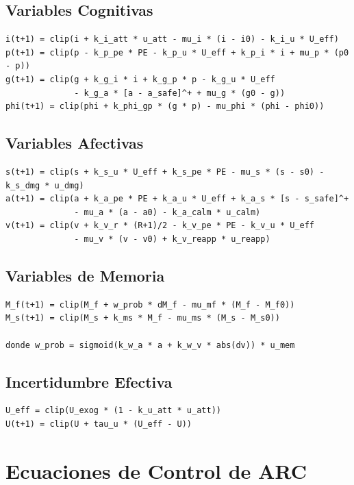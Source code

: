 \documentclass{article}
\begin{document}
\subsection{Variables Cognitivas}

\begin{verbatim}
i(t+1) = clip(i + k_i_att * u_att - mu_i * (i - i0) - k_i_u * U_eff)
p(t+1) = clip(p - k_p_pe * PE - k_p_u * U_eff + k_p_i * i + mu_p * (p0 - p))
g(t+1) = clip(g + k_g_i * i + k_g_p * p - k_g_u * U_eff
              - k_g_a * [a - a_safe]^+ + mu_g * (g0 - g))
phi(t+1) = clip(phi + k_phi_gp * (g * p) - mu_phi * (phi - phi0))
\end{verbatim}

\subsection{Variables Afectivas}

\begin{verbatim}
s(t+1) = clip(s + k_s_u * U_eff + k_s_pe * PE - mu_s * (s - s0) - k_s_dmg * u_dmg)
a(t+1) = clip(a + k_a_pe * PE + k_a_u * U_eff + k_a_s * [s - s_safe]^+
              - mu_a * (a - a0) - k_a_calm * u_calm)
v(t+1) = clip(v + k_v_r * (R+1)/2 - k_v_pe * PE - k_v_u * U_eff
              - mu_v * (v - v0) + k_v_reapp * u_reapp)
\end{verbatim}

\subsection{Variables de Memoria}

\begin{verbatim}
M_f(t+1) = clip(M_f + w_prob * dM_f - mu_mf * (M_f - M_f0))
M_s(t+1) = clip(M_s + k_ms * M_f - mu_ms * (M_s - M_s0))

donde w_prob = sigmoid(k_w_a * a + k_w_v * abs(dv)) * u_mem
\end{verbatim}

\subsection{Incertidumbre Efectiva}

\begin{verbatim}
U_eff = clip(U_exog * (1 - k_u_att * u_att))
U(t+1) = clip(U + tau_u * (U_eff - U))
\end{verbatim}

\section{Ecuaciones de Control de ARC}
\end{document}
